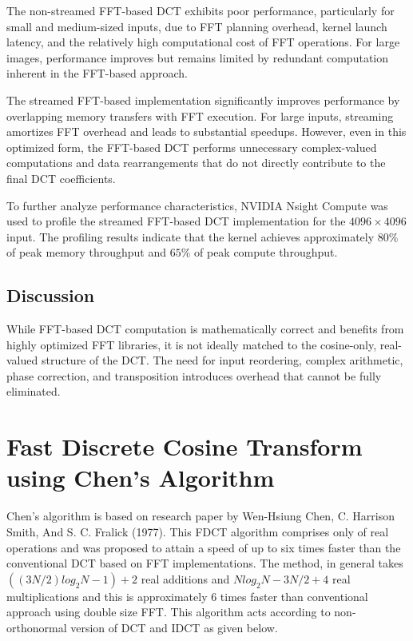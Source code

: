 \documentclass{article}
\begin{document}
The non-streamed FFT-based DCT exhibits poor performance, particularly for small and medium-sized inputs, due to FFT planning overhead, kernel launch latency, and the relatively high computational cost of FFT operations. For large images, performance improves but remains limited by redundant computation inherent in the FFT-based approach. 

\noindent The streamed FFT-based implementation significantly improves performance by overlapping memory transfers with FFT execution. For large inputs, streaming amortizes FFT overhead and leads to substantial speedups. However, even in this optimized form, the FFT-based DCT performs unnecessary complex-valued computations and data rearrangements that do not directly contribute to the final DCT coefficients.

\noindent To further analyze performance characteristics, NVIDIA Nsight Compute was used to profile the streamed FFT-based DCT implementation for the $4096 \times 4096$ input. The profiling results indicate that the kernel achieves approximately $80\%$ of peak memory throughput and $65\%$ of peak compute throughput.

\subsection{Discussion}

While FFT-based DCT computation is mathematically correct and benefits from highly optimized FFT libraries, it is not ideally matched to the cosine-only, real-valued structure of the DCT. The need for input reordering, complex arithmetic, phase correction, and transposition introduces overhead that cannot be fully eliminated.

\section{Fast Discrete Cosine Transform using Chen's Algorithm} 

Chen's algorithm is based on research paper by Wen-Hsiung Chen, C. Harrison Smith, And S. C. Fralick (1977). This FDCT algorithm comprises only of real operations and was proposed to attain a speed of up to six times faster than the conventional DCT based on FFT implementations. The method, in general  takes $((3N/2) log_2N-1) + 2$ real additions and $Nlog_2N-3N/2+4$ real multiplications and this is approximately 6 times faster than conventional approach using double size FFT. This algorithm acts according to  non-orthonormal version of DCT and IDCT as given below.
\end{document}
